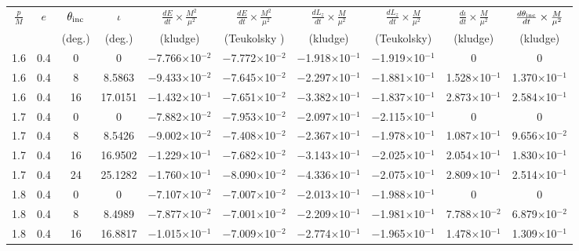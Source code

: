 \documentclass[aps,prd,twocolumn,showpacs,groupedaddress,nofootinbib]{revtex4}
\newcommand\T{\rule{0pt}{3ex}}
\newcommand\B{\rule[-2ex]{0pt}{0pt}}
\begin{document}
\begin{widetext}
\begin{table}[h]
\begin{tabular}{|c|c|c|c|c|c|c|c|c|c|}
\hline
 \T\B$\frac{p}{M}$ & $e$ & $\theta_{\rm inc}$& $\iota$& $\frac{dE}{dt}\times\frac{M^2}{\mu^2}$ & $\frac{dE}{dt}\times\frac{M^2}{\mu^2}$ & $\frac{dL_z}{dt}\times\frac{M}{\mu^2}$ & $\frac{dL_z}{dt}\times\frac{M}{\mu^2}$ & $\frac{d\iota}{dt}\times\frac{M}{\mu^2}$& $\frac{d\theta_{\rm inc}}{dt}\times\frac{M}{\mu^2}$ \\
&&(deg.)&(deg.)& (kludge) & (Teukolsky ) & (kludge) & (Teukolsky)& (kludge) &  (kludge) \\
\hline
\T  1.6&  0.4&  0&  0& $-$7.766$\times$10$^{-2}$& $-$7.772$\times$10$^{-2}$& $-$1.918$\times$10$^{-1}$& $-$1.919$\times$10$^{-1}$&  0&    0\\
  1.6&  0.4&  8&  8.5863& $-$9.433$\times$10$^{-2}$& $-$7.645$\times$10$^{-2}$& $-$2.297$\times$10$^{-1}$& $-$1.881$\times$10$^{-1}$&  1.528$\times$10$^{-1}$&    1.370$\times$10$^{-1}$\\
  1.6&  0.4& 16& 17.0151& $-$1.432$\times$10$^{-1}$& $-$7.651$\times$10$^{-2}$& $-$3.382$\times$10$^{-1}$& $-$1.837$\times$10$^{-1}$&  2.873$\times$10$^{-1}$&    2.584$\times$10$^{-1}$\\
  1.7&  0.4&  0&  0& $-$7.882$\times$10$^{-2}$& $-$7.953$\times$10$^{-2}$& $-$2.097$\times$10$^{-1}$& $-$2.115$\times$10$^{-1}$&  0&    0\\
  1.7&  0.4&  8&  8.5426& $-$9.002$\times$10$^{-2}$& $-$7.408$\times$10$^{-2}$& $-$2.367$\times$10$^{-1}$& $-$1.978$\times$10$^{-1}$&  1.087$\times$10$^{-1}$&    9.656$\times$10$^{-2}$\\
  1.7&  0.4& 16& 16.9502& $-$1.229$\times$10$^{-1}$& $-$7.682$\times$10$^{-2}$& $-$3.143$\times$10$^{-1}$& $-$2.025$\times$10$^{-1}$&  2.054$\times$10$^{-1}$&    1.830$\times$10$^{-1}$\\
  1.7&  0.4& 24& 25.1282& $-$1.760$\times$10$^{-1}$& $-$8.090$\times$10$^{-2}$& $-$4.336$\times$10$^{-1}$& $-$2.075$\times$10$^{-1}$&  2.809$\times$10$^{-1}$&    2.514$\times$10$^{-1}$\\
  1.8&  0.4&  0&  0& $-$7.107$\times$10$^{-2}$& $-$7.007$\times$10$^{-2}$& $-$2.013$\times$10$^{-1}$& $-$1.988$\times$10$^{-1}$&  0&    0\\
  1.8&  0.4&  8&  8.4989& $-$7.877$\times$10$^{-2}$& $-$7.001$\times$10$^{-2}$& $-$2.209$\times$10$^{-1}$& $-$1.981$\times$10$^{-1}$&  7.788$\times$10$^{-2}$&    6.879$\times$10$^{-2}$\\
  1.8&  0.4& 16& 16.8817& $-$1.015$\times$10$^{-1}$& $-$7.009$\times$10$^{-2}$& $-$2.774$\times$10$^{-1}$& $-$1.965$\times$10$^{-1}$&  1.478$\times$10$^{-1}$&    1.309$\times$10$^{-1}$\\

\end{tabular}
\end{table}
\end{widetext}
\end{document}
